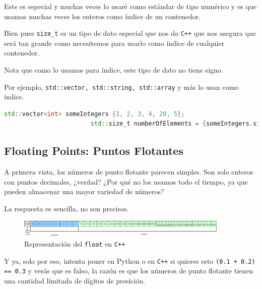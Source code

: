 \documentclass[12pt, fleqn]{report}                             %
\theoremstyle{break}                                            %
\newcommand \Cpp  {\texttt{C++} }                               %
\begin{document}
                    Este es especial y muchas veces lo usaré como estándar de tipo numérico
                    y es que usamos muchas veces los enteros como índice de un contenedor.

                    Bien pues \texttt{size\_t} es un tipo de dato especial que nos da \Cpp
                    que nos asegura que será tan grande como necesitemos para usarlo como índice
                    de cualquier contenedor.

                    Nota que como lo usamos para índice, este tipo de dato no tiene signo.

                    Por ejemplo, \texttt{std::vector, std::string, std::array} y más lo usan
                    como índice.

                    \begin{lstlisting}[language=C++, gobble=24]
                        std::vector<int> someIntegers {1, 2, 3, 4, 20, 5};
                        std::size_t numberOfElements = {someIntegers.size()}; 
                    \end{lstlisting}
                    

            \clearpage
            \subsection{Floating Points: Puntos Flotantes}

                A primera vista, los números de punto flotante parecen simples.
                Son solo enteros con puntos decimales, ¿verdad? 
                ¿Por qué no los usamos todo el tiempo, ya que pueden almacenar una mayor variedad de números?

                La respuesta es sencilla, no son precisos.

                \begin{figure}[h]
                    \centering
                    \includegraphics[width=0.9\textwidth]{IEEEFP}
                    \caption{\footnotesize{Representación del \texttt{float} en \Cpp}}
                \end{figure}

                Y ya, solo por eso, intenta poner en Python o en \Cpp si quieres esto 
                \texttt{(0.1 + 0.2) == 0.3} y verás que es falso, la razón es que los números de punto
                flotante tienen una cantidad límitada de dígitos de presición.
\end{document}
